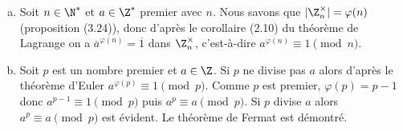 \begin{enumerate}[a)]
  \item Soit $n\in\N^*$ et $a\in\Z^*$ premier avec $n$. Nous savons que
    $|\Z^\times_n|=\varphi(n)$ (proposition (3.24)), donc d'après le corollaire
    (2.10) du théorème de Lagrange on a $\overline{a}^{\varphi(n)}=\overline{1}$
    dans $\Z^\times_n$, c'est-à-dire $a^{\varphi(n)}\equiv 1\pmod{n}$.
  
  \item Soit $p$ est un nombre premier et $a\in\Z$. Si $p$ ne divise pas $a$
    alors d'après le théorème d'Euler $a^{\varphi(p)}\equiv 1\pmod{p}$.  Comme
    $p$ est premier, $\varphi(p)=p-1$ donc $a^{p-1}\equiv 1\pmod{p}$ puis
    $a^p\equiv a\pmod{p}$. Si $p$ divise $a$ alors $a^p\equiv a\pmod{p}$ est
    évident. Le théorème de Fermat est démontré.
\end{enumerate}


